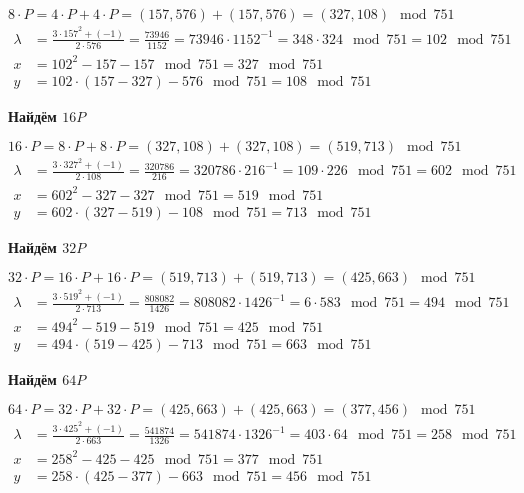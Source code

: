 $8 \cdot P = 4 \cdot P + 4 \cdot P = (157, 576) + (157, 576) = (327, 108) \mod 751$
\begin{equation*}
	\begin{aligned}
		\lambda &= \frac{ 3 \cdot 157^2 + (-1) }{2 \cdot 576} = \frac{73946}{1152} = 73946 \cdot 1152^{-1} = 348 \cdot 324\mod{751} = 102\mod{751} \\
		x &= 102^2 - 157 - 157 \mod{751} = 327\mod{751} \\
		y &= 102 \cdot (157 - 327) - 576\mod{751} = 108\mod{751}
	\end{aligned}
\end{equation*}

\textbf{Найдём $16P$}

$16 \cdot P = 8 \cdot P + 8 \cdot P = (327, 108) + (327, 108) = (519, 713) \mod 751$
\begin{equation*}
	\begin{aligned}
		\lambda &= \frac{ 3 \cdot 327^2 + (-1) }{2 \cdot 108} = \frac{320786}{216} = 320786 \cdot 216^{-1} = 109 \cdot 226\mod{751} = 602\mod{751} \\
		x &= 602^2 - 327 - 327 \mod{751} = 519\mod{751} \\
		y &= 602 \cdot (327 - 519) - 108\mod{751} = 713\mod{751}
	\end{aligned}
\end{equation*}

\textbf{Найдём $32P$}

$32 \cdot P = 16 \cdot P + 16 \cdot P = (519, 713) + (519, 713) = (425, 663) \mod 751$
\begin{equation*}
	\begin{aligned}
		\lambda &= \frac{ 3 \cdot 519^2 + (-1) }{2 \cdot 713} = \frac{808082}{1426} = 808082 \cdot 1426^{-1} = 6 \cdot 583\mod{751} = 494\mod{751} \\
		x &= 494^2 - 519 - 519 \mod{751} = 425\mod{751} \\
		y &= 494 \cdot (519 - 425) - 713\mod{751} = 663\mod{751}
	\end{aligned}
\end{equation*}

\textbf{Найдём $64P$}

$64 \cdot P = 32 \cdot P + 32 \cdot P = (425, 663) + (425, 663) = (377, 456) \mod 751$
\begin{equation*}
	\begin{aligned}
		\lambda &= \frac{ 3 \cdot 425^2 + (-1) }{2 \cdot 663} = \frac{541874}{1326} = 541874 \cdot 1326^{-1} = 403 \cdot 64\mod{751} = 258\mod{751} \\
		x &= 258^2 - 425 - 425 \mod{751} = 377\mod{751} \\
		y &= 258 \cdot (425 - 377) - 663\mod{751} = 456\mod{751}
	\end{aligned}
\end{equation*}

